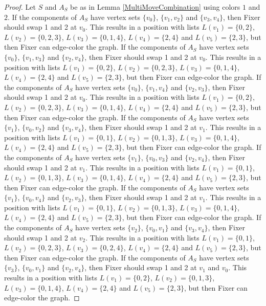\documentclass[12pt]{amsart}
\theoremstyle{plain}
\theoremstyle{definition}
\theoremstyle{remark}
\begin{document}
\begin{proof}
Let $S$ and $A_S$ be as in Lemma \ref{MultiMoveCombination} using colors $1$ and $2$. If the components of $A_S$ have vertex sets $\{v_0\}$, $\{v_1, v_2\}$ and $\{v_3, v_4\}$, then Fixer should swap 1 and 2 at $v_0$. This results in a position with lists $L(v_1) = \{0, 2\}$, $L(v_2) = \{0, 2, 3\}$, $L(v_3) = \{0, 1, 4\}$, $L(v_4) = \{2, 4\}$ and $L(v_5) = \{2, 3\}$, but then Fixer can edge-color the graph.
If the components of $A_S$ have vertex sets $\{v_0\}$, $\{v_1, v_3\}$ and $\{v_2, v_4\}$, then Fixer should swap 1 and 2 at $v_0$. This results in a position with lists $L(v_1) = \{0, 2\}$, $L(v_2) = \{0, 2, 3\}$, $L(v_3) = \{0, 1, 4\}$, $L(v_4) = \{2, 4\}$ and $L(v_5) = \{2, 3\}$, but then Fixer can edge-color the graph.
If the components of $A_S$ have vertex sets $\{v_0\}$, $\{v_1, v_4\}$ and $\{v_2, v_3\}$, then Fixer should swap 1 and 2 at $v_0$. This results in a position with lists $L(v_1) = \{0, 2\}$, $L(v_2) = \{0, 2, 3\}$, $L(v_3) = \{0, 1, 4\}$, $L(v_4) = \{2, 4\}$ and $L(v_5) = \{2, 3\}$, but then Fixer can edge-color the graph.
If the components of $A_S$ have vertex sets $\{v_1\}$, $\{v_0, v_2\}$ and $\{v_3, v_4\}$, then Fixer should swap 1 and 2 at $v_1$. This results in a position with lists $L(v_1) = \{0, 1\}$, $L(v_2) = \{0, 1, 3\}$, $L(v_3) = \{0, 1, 4\}$, $L(v_4) = \{2, 4\}$ and $L(v_5) = \{2, 3\}$, but then Fixer can edge-color the graph.
If the components of $A_S$ have vertex sets $\{v_1\}$, $\{v_0, v_3\}$ and $\{v_2, v_4\}$, then Fixer should swap 1 and 2 at $v_1$. This results in a position with lists $L(v_1) = \{0, 1\}$, $L(v_2) = \{0, 1, 3\}$, $L(v_3) = \{0, 1, 4\}$, $L(v_4) = \{2, 4\}$ and $L(v_5) = \{2, 3\}$, but then Fixer can edge-color the graph.
If the components of $A_S$ have vertex sets $\{v_1\}$, $\{v_0, v_4\}$ and $\{v_2, v_3\}$, then Fixer should swap 1 and 2 at $v_1$. This results in a position with lists $L(v_1) = \{0, 1\}$, $L(v_2) = \{0, 1, 3\}$, $L(v_3) = \{0, 1, 4\}$, $L(v_4) = \{2, 4\}$ and $L(v_5) = \{2, 3\}$, but then Fixer can edge-color the graph.
If the components of $A_S$ have vertex sets $\{v_2\}$, $\{v_0, v_1\}$ and $\{v_3, v_4\}$, then Fixer should swap 1 and 2 at $v_2$. This results in a position with lists $L(v_1) = \{0, 1\}$, $L(v_2) = \{0, 2, 3\}$, $L(v_3) = \{0, 2, 4\}$, $L(v_4) = \{2, 4\}$ and $L(v_5) = \{2, 3\}$, but then Fixer can edge-color the graph.
If the components of $A_S$ have vertex sets $\{v_3\}$, $\{v_0, v_1\}$ and $\{v_2, v_4\}$, then Fixer should swap 1 and 2 at $v_1$ and $v_0$. This results in a position with lists $L(v_1) = \{0, 2\}$, $L(v_2) = \{0, 1, 3\}$, $L(v_3) = \{0, 1, 4\}$, $L(v_4) = \{2, 4\}$ and $L(v_5) = \{2, 3\}$, but then Fixer can edge-color the graph.

\end{proof}
\end{document}

